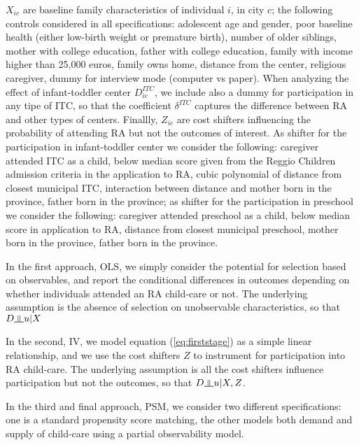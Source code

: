 \documentclass[12pt]{article}
\newcommand{\indep}{\rotatebox[origin=c]{90}{$\models$}}
\begin{document}
$X_{ic}$ are baseline family characteristics of individual $i$, in city $c$;
the following controls considered in all specifications: adolescent age and gender, poor baseline health (either low-birth weight or premature birth), number of older siblings, mother with college education, father with college education, family with income higher than 25,000 euros, family owns home, distance from the center, religious caregiver, dummy for interview mode (computer vs paper). When analyzing the effect of infant-toddler center $D^{ITC}_{ic}$, we include also a dummy for participation in any tipe of ITC, so that the coefficient $\delta^{ITC}$ captures the difference between RA and other types of centers.
Finallly, $Z_{ic}$ are cost shifters influencing the probability of attending RA but not the outcomes of interest. As shifter for the participation in infant-toddler center we consider the following: caregiver attended ITC as a child, below median score given from the Reggio Children admission criteria in the application to RA, cubic polynomial of distance from closest municipal ITC, interaction between distance and mother born in the province, father born in the province; as shifter for the participation in preschool we consider the following: caregiver attended preschool as a child, below median score in application to RA, distance from closest municipal preschool, mother born in the province, father born in the province.

\medskip

In the first approach, OLS, we simply consider the potential for selection based on observables, and report the conditional differences in outcomes depending on whether individuals attended an RA child-care or not. The underlying assumption is the absence of selection on unobservable characteristics, so that $D \indep u|X$

In the second, IV, we model equation (\ref{eq:firststage}) as a simple linear relationship, and we use the cost shifters $Z$ to instrument for participation into RA child-care. The underlying assumption is all the cost shifters influence participation but not the outcomes, so that $D \indep u|X,Z$.

In the third and final approach, PSM, we consider two different specifications: one is a standard propensity score matching, the other models both demand and supply of child-care using a partial observability model. 
\end{document}
